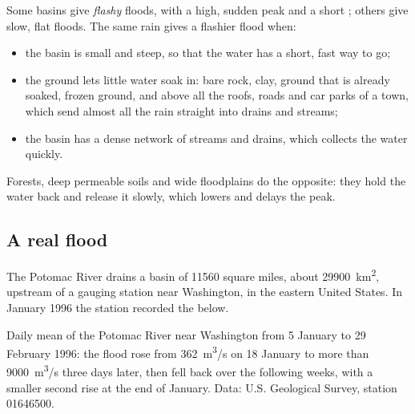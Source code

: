 Some basins give \emph{flashy} floods, with a high, sudden peak and a short
; others give slow, flat floods. The same rain gives a flashier flood
when:
\begin{itemize}
  \item the basin is small and steep, so that the water has a short, fast
        way to go;
  \item the ground lets little water soak in: bare rock, clay, ground that is
        already soaked, frozen ground, and above all the roofs, roads and car
        parks of a town, which send almost all the rain straight into drains
        and streams;
  \item the basin has a dense network of streams and drains, which collects
        the water quickly.
\end{itemize}
Forests, deep permeable soils and wide floodplains do the opposite: they hold
the water back and release it slowly, which lowers and delays the peak.

\subsection*{A real flood}

The Potomac River drains a basin of \num{11560} square miles, about
\qty{29900}{km^2}, upstream of a gauging station near Washington, in the
eastern United States. In January 1996 the station recorded the 
below.

\begin{omfigure}

{\small Daily mean  of the Potomac River near Washington from
5 January to 29 February 1996: the flood rose from \qty{362}{m^3/s} on 18 January
to more than \qty{9000}{m^3/s} three days later, then fell back over the
following weeks, with a smaller second rise at the end of January. Data: U.S.
Geological Survey, station 01646500.}
\end{omfigure}

